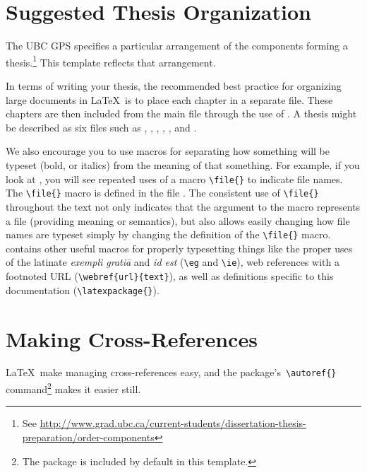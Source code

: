 \section{Suggested Thesis Organization}
\label{sec:SuggestedThesisOrganization}

The \acs{UBC} \acf{GPS} specifies a particular arrangement of the
components forming a thesis.\footnote{See
    \url{http://www.grad.ubc.ca/current-students/dissertation-thesis-preparation/order-components}}
This template reflects that arrangement.

In terms of writing your thesis, the recommended best practice for
organizing large documents in \LaTeX\ is to place each chapter in
a separate file.  These chapters are then included from the main
file through the use of \verb++.  A thesis might
be described as six files such as ,
, , ,
, and .

We also encourage you to use macros for separating how something
will be typeset (\eg bold, or italics) from the meaning of that
something. 
For example, if you look at , you will see repeated
uses of a macro \verb+\file{}+ to indicate file names.
The \verb+\file{}+ macro is defined in the file .
The consistent use of \verb+\file{}+ throughout the text not only
indicates that the argument to the macro represents a file (providing
meaning or semantics), but also allows easily changing how
file names are typeset simply by changing the definition of the
\verb+\file{}+ macro.
 contains other useful macros for properly typesetting
things like the proper uses of the latinate \emph{exempli grati\={a}}
and \emph{id est} (\ie \verb+\eg+ and \verb+\ie+), 
web references with a footnoted \acs{URL} (\verb+\webref{url}{text}+),
as well as definitions specific to this documentation
(\verb+\latexpackage{}+).

\section{Making Cross-References}
\label{sec:CrossReferences}

\LaTeX\ make managing cross-references easy, and the 
package's\ \verb+\autoref{}+ command\footnote{%
    The  package is included by default in this
    template.}
makes it easier still. 

